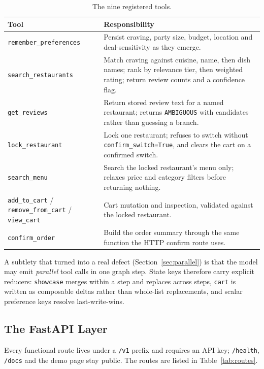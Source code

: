 \documentclass[11pt,a4paper]{article}
\newcommand{\code}[1]{\texttt{\small #1}}
\begin{document}
\begin{table}[htbp]
\centering
\caption{The nine registered tools.}
\label{tab:tools}
\small
\begin{tabularx}{\textwidth}{@{}l X@{}}
\toprule
\textbf{Tool} & \textbf{Responsibility} \\
\midrule
\code{remember\_preferences} & Persist craving, party size, budget, location and deal-sensitivity as they emerge. \\
\code{search\_restaurants} & Match craving against cuisine, name, then dish names; rank by relevance tier, then weighted rating; return review counts and a confidence flag. \\
\code{get\_reviews} & Return stored review text for a named restaurant; returns \code{AMBIGUOUS} with candidates rather than guessing a branch. \\
\code{lock\_restaurant} & Lock one restaurant; refuses to switch without \code{confirm\_switch=True}, and clears the cart on a confirmed switch. \\
\code{search\_menu} & Search the locked restaurant's menu only; relaxes price and category filters before returning nothing. \\
\code{add\_to\_cart} / \code{remove\_from\_cart} / \code{view\_cart} & Cart mutation and inspection, validated against the locked restaurant. \\
\code{confirm\_order} & Build the order summary through the same function the HTTP confirm route uses. \\
\bottomrule
\end{tabularx}
\end{table}

A subtlety that turned into a real defect (Section~\ref{sec:parallel}) is that
the model may emit \emph{parallel} tool calls in one graph step. State keys
therefore carry explicit reducers: \code{showcase} merges within a step and
replaces across steps, \code{cart} is written as composable deltas rather than
whole-list replacements, and scalar preference keys resolve last-write-wins.

\subsection{The FastAPI Layer}

Every functional route lives under a \code{/v1} prefix and requires an API key;
\code{/health}, \code{/docs} and the demo page stay public. The routes are
listed in Table~\ref{tab:routes}.
\end{document}
